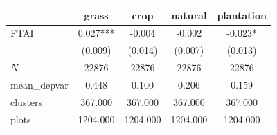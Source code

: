 {
\def\sym#1{\ifmmode^{#1}\else\(^{#1}\)\fi}
\begin{tabular}{l*{4}{c}}
\toprule
          &\multicolumn{1}{c}{grass}&\multicolumn{1}{c}{crop}&\multicolumn{1}{c}{natural}&\multicolumn{1}{c}{plantation}\\
\midrule
FTAI      &    0.027***&   -0.004   &   -0.002   &   -0.023*  \\
          &  (0.009)   &  (0.014)   &  (0.007)   &  (0.013)   \\
\midrule
\(N\)     &    22876   &    22876   &    22876   &    22876   \\
mean\_depvar&    0.448   &    0.100   &    0.206   &    0.159   \\
clusters  &  367.000   &  367.000   &  367.000   &  367.000   \\
plots     & 1204.000   & 1204.000   & 1204.000   & 1204.000   \\
\bottomrule
\end{tabular}
}
